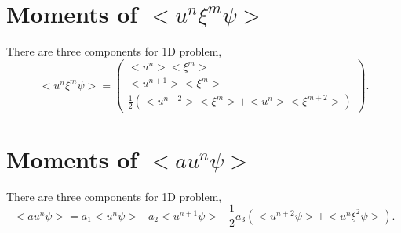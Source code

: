 \documentclass[a4paper]{book}
\begin{document}
\begin{appendices}
    \section*{Moments of $<u^n\xi^m\psi>$}
    There are three components for 1D problem,
    $$
    <u^n\xi^m\psi>=\begin{pmatrix}
        <u^n><\xi^m>\\
        <u^{n+1}><\xi^m>\\
        \frac{1}{2}\left(<u^{n+2}><\xi^m>+<u^n><\xi^{m+2}>\right)
    \end{pmatrix}.
    $$

    \section*{Moments of $<au^n\psi>$}
    There are three components for 1D problem,
    $$<au^n\psi>=a_1<u^n\psi>+a_2<u^{n+1}\psi>+\frac{1}{2}a_3\left(<u^{n+2}\psi>+<u^n\xi^2\psi>\right).$$
\end{appendices}

\cleardoublepage
{}
{}


\end{document}
